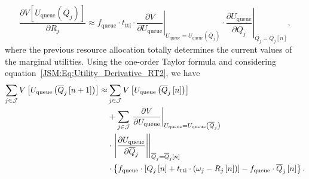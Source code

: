 \begin{apendicesenv}
\begin{equation}
\label{JSM:Eq:Utility_Derivative_RT2}
\frac{\partial V\left[U_{\mathrm{queue}}\left(\overline{Q}_{j}\right)\right]}{\partial R_{j}} \approx
f_{\mathrm{queue}}
\cdot t_{\mathrm{tti}} \cdot
\left.\dfrac{\partial V}{\partial U_{\mathrm{queue}}}\right\vert_{U_{\mathrm{queue}} = U_{\mathrm{queue}}\left(\overline{Q}_{j}\right)}
\cdot
\left.\dfrac{\partial U_{\mathrm{queue}}}{\partial \overline{Q}_{j}}\right\vert_{\overline{Q}_{j} = \overline{Q}_{j}\left[n\right]},
\end{equation}
%
where the previous resource allocation totally determines the current values of the marginal utilities. 
Using the one-order Taylor formula \cite{Art:Song2005_p2, Phd:Emanuel2011} and considering equation~\eqref{JSM:Eq:Utility_Derivative_RT2}, we have
%
\begin{align}
\label{JSM:Eq:Taylor_RT}
\sum_{j \in \mathcal{J}} V\left[U_{\mathrm{queue}}\left(\overline{Q}_{j}\left[n+1\right]\right)\right] \approx & \sum_{j \in \mathcal{J}} V\left[U_{\mathrm{queue}}\left(\overline{Q}_{j}\left[n\right]\right)\right] \notag\\
& + \sum_{j \in \mathcal{J}} \left.\dfrac{\partial V}{\partial U_{\mathrm{queue}}}\right\vert_{U_{\mathrm{queue}} = U_{\mathrm{queue}}\left(\overline{Q}_{j}\right)} \notag\\
& \cdot \left.\left|\dfrac{\partial U_{\mathrm{queue}}}{\partial \overline{Q}_{j}}\right|\right\vert_{\overline{Q}_{j} = \overline{Q}_{j}\left[n\right]} \notag\\ & \cdot \left\{f_{\mathrm{queue}} \cdot \left[ Q_{j}\left[n\right] + t_{\mathrm{tti}} \cdot \left( \omega_j - R_j\left[n\right] \right)\right] - f_{\mathrm{queue}} \cdot \overline{Q}_{j}\left[n\right]\right\}.
\end{align}


\end{apendicesenv}
